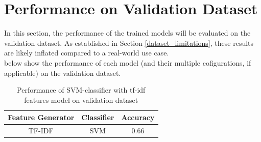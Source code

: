 

\section{Performance on Validation Dataset}

In this section, the performance of the trained models will be evaluated on the validation dataset. As established in Section \ref{dataset_limitations}, these results are likely inflated compared to a real-world use case. \\

\noindent
{} below show the performance of each model (and their multiple cofigurations, if applicable) on the validation dataset.


\begin{table}[H]
    \caption{Performance of SVM-classifier with tf-idf features model on validation dataset}
    \label{tab:validation_perfomance_svm_tfidf}
    \begin{center}
        \begin{tabular}{c|c|c}
            \textbf{Feature Generator} & \textbf{Classifier} & \textbf{Accuracy} \\
            \hline
            TF-IDF            & SVM        &   0.66  
        \end{tabular}
    \end{center}
\end{table}

